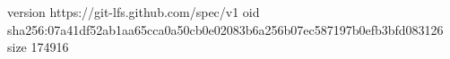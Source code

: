 version https://git-lfs.github.com/spec/v1
oid sha256:07a41df52ab1aa65cca0a50cb0e02083b6a256b07ec587197b0efb3bfd083126
size 174916
